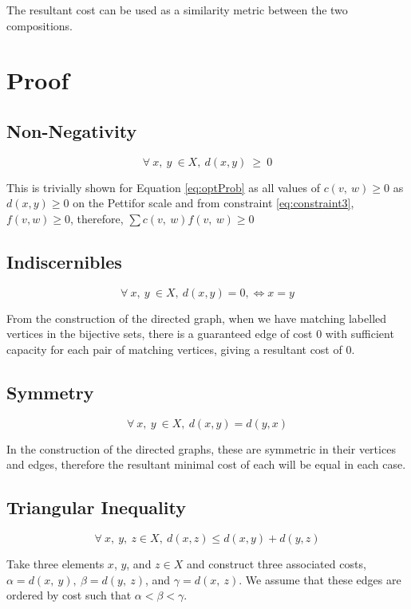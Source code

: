 \documentclass{article}
\begin{document}
The resultant cost can be used as a similarity metric between the two compositions.



\section{Proof}
\subsection{Non-Negativity}
$$\forall\ x,\ y\ \in X,\ d(x, y)\ \geq\ 0$$

This is trivially shown for Equation \ref{eq:optProb} as all values of $c(v,\ w) \geq 0$ as $d(x, y) \geq 0$ on the Pettifor scale and from constraint \ref{eq:constraint3}, $f(v, w) \geq 0$, therefore, $\sum c(v,\ w)f(v,\ w) \geq 0$

\subsection{Indiscernibles}
$$\forall\ x,\ y\ \in X,\ d(x, y) = 0, \Leftrightarrow x = y$$

From the construction of the directed graph, when we have matching labelled vertices in the bijective sets, there is a guaranteed edge of cost 0 with sufficient capacity for each pair of matching vertices, giving a resultant cost of 0.

\subsection{Symmetry}
$$\forall\ x,\ y\ \in X,\ d(x, y) = d(y, x)$$

In the construction of the directed graphs, these are symmetric in their vertices and edges, therefore the resultant minimal cost of each will be equal in each case.

\subsection{Triangular Inequality}
$$\forall\ x,\ y,\ z \in X,\ d(x, z) \leq d(x, y) + d(y, z)$$

Take three elements $x$, $y$, and $z \in X$ and construct three associated costs, $\alpha = d(x,\ y),\ \beta = d(y,\ z)$, and $\gamma = d(x,\ z)$. We assume that these edges are ordered by cost such that $\alpha < \beta < \gamma$.
\end{document}
